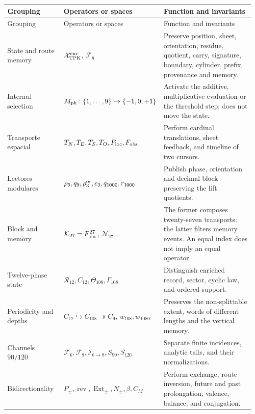 \begingroup
\small
\renewcommand{\arraystretch}{1.12}
\begin{longtable}{@{}p{}p{}p{}@{}}
\toprule
Grouping&Operators or spaces&Function and invariants\\
\midrule
\endfirsthead
\toprule
Grouping&Operators or spaces&Function and invariants\\
\midrule
\endhead
State and route memory&
\(\mathcal X_{\rm TPK}^{\rm enr}\), \(\mathcal F_q\)&
Preserve position, sheet, orientation, residue, quotient, carry, signature,
boundary, cylinder, prefix, provenance and memory.\\

Internal selection&
\(M_{\rm ph}:\{1,\ldots,9\}\to\{-1,0,+1\}\)&
Activate the additive, multiplicative evaluation or the threshold step; does not move
the state.\\

Transporte espacial&
\(T_N,T_E,T_S,T_O,F_{\rm loc},F_{\rm obs}\)&
Perform cardinal translations, sheet feedback, and timeline of two cursors.\\

Lectores modulares&
\(\rho_9,q_9,\rho_3^{\rm or},c_3,q_{1000},r_{1000}\)&
Publish phase, orientation and decimal block preserving the lift quotients.\\

Block and memory&
\(\mathcal K_{27}=F_{\rm obs}^{27}\), \(\mathcal N_{27}\)&
The former composes twenty-seven transports; the latter filters memory
events. An equal index does not imply an equal operator.\\

Twelve-phase state&
\(\mathcal R_{12},C_{12},\Theta_{108},\Gamma_{108}\)&
Distinguish enriched record, sector, cyclic law, and ordered support.\\

Periodicity and depths&
\(C_{12}\hookrightarrow C_{108}\twoheadrightarrow C_9\),
\(w_{108},w_{1080}\)&
Preserves the non-splittable extent, words of different lengths and
the vertical memory.\\

Channels \(90/120\)&
\(\mathcal F_6,\mathcal F_8,\mathcal I_{6\to8},
S_{90},S_{120}\)&
Separate finite incidences, analytic tails, and their normalizations.\\

Bidirectionality&
\(P_\pm,\operatorname{rev},\operatorname{Ext}_\pm,
N_\pm,\beta,C_M\)&
Perform exchange, route inversion, future and past prolongation, valence, balance, and conjugation.\\


\end{longtable}
